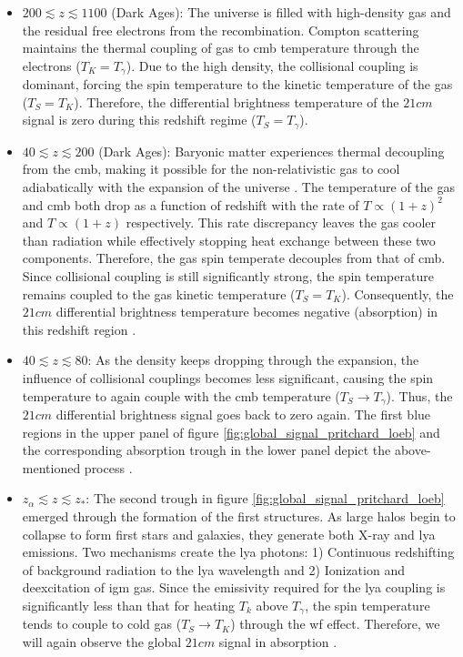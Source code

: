 \documentclass[12pt, TexShade, letterpaper]{report}
\begin{document}
\begin{itemize}
\item $200 \lesssim z \lesssim 1100$ (Dark Ages): The universe is filled with high-density gas and the residual free electrons from the recombination. Compton scattering maintains the thermal coupling of gas to \gls{cmb} temperature through the electrons ($T_K = T_\gamma$). Due to the high density, the collisional coupling is dominant, forcing the spin temperature to the kinetic temperature of the gas ($T_S = T_K$). 
Therefore, the differential brightness temperature of the $21cm$ signal is zero during this redshift regime ($T_S = T_\gamma$)\cite{21century}.\par

\item $40 \lesssim z \lesssim 200$ (Dark Ages): Baryonic matter experiences thermal decoupling from the \gls{cmb}, making it possible for the non-relativistic gas to cool adiabatically with the expansion of the universe \cite{21century}. The temperature of the gas and \gls{cmb} both drop as a function of redshift with the rate of $T\propto (1+z)^{2}$ and $T\propto (1+z)$ respectively. This rate discrepancy leaves the gas cooler than radiation while effectively stopping heat exchange between these two components. Therefore, the gas spin temperate decouples from that of \gls{cmb}. Since collisional coupling is still significantly strong, the spin temperature remains coupled to the gas kinetic temperature ($T_S = T_K$). Consequently, the $21cm$ differential brightness temperature becomes negative (absorption) in this redshift region \cite{map_universe, 21century}.\par

\item $40 \lesssim z \lesssim 80$: As the density keeps dropping through the expansion, the influence of collisional couplings becomes less significant, causing the spin temperature to again couple with the \gls{cmb} temperature ($T_S \rightarrow T_\gamma$). Thus, the $21cm$ differential brightness signal goes back to zero again\cite{map_universe}. The first blue regions in the upper panel of figure \ref{fig:global_signal_pritchard_loeb} and the corresponding absorption trough in the lower panel depict the above-mentioned process \cite{map_universe, 21century}.\par

\item $z_\alpha \lesssim z \lesssim z_*$: The second trough in figure \ref{fig:global_signal_pritchard_loeb} emerged through the formation of the first structures. As large halos begin to collapse to form first stars and galaxies, they generate both X-ray and \gls{lya} emissions. Two mechanisms create the \gls{lya} photons: 1) Continuous redshifting of background radiation to the \gls{lya} wavelength and 2) Ionization and deexcitation of \gls{igm} gas. Since the emissivity required for the \gls{lya} coupling is significantly less than that for heating $T_k$ above $T_\gamma$, the spin temperature tends to couple to cold gas ($T_S \rightarrow T_K$) through the \gls{wf} effect. Therefore, we will again observe the global $21cm$ signal in absorption \cite{map_universe, 21century}.\par


\end{itemize}
\end{document}
